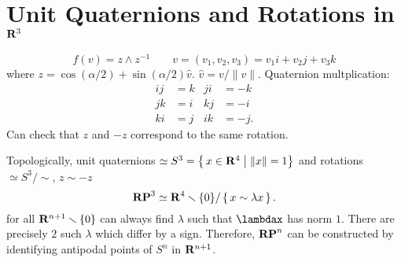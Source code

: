 \section[Unit Quaternions and Rotations in R3]{Unit Quaternions and Rotations in $\mathbf{R}^3$}
\[
f(v)=z\wedge z^{-1}\qquad
v=(v_1,v_2,v_3)=v_1i+v_2j+v_3k
\]
where $z=\cos(\alpha/2)+\sin(\alpha/2)\hat v$. $\hat v=v/\|v\|$. Quaternion
multplication:
\begin{align*}
ij&=k&ji&=-k\\
jk&=i&kj&=-i\\
ki&=j&ik&=-j.
\end{align*}
Can check that $z$ and $-z$ correspond to the same rotation.

Topologically, unit quaternions $\simeq
S^3=\left\{\,x\in\mathbf{R}^4\;\middle|\;\|x\|=1\right\}$ and rotations $\simeq
S^3/{\sim}$, $z\sim -z$
\[
\bfRP^3\simeq\bfR^4\minus\{0\}/\left\{\,x\sim\lambda x\,\right\}.
\]
for all $\bfR^{n+1}\minus\{0\}$ can always find $\lambda$ such that
$\lambdax$ has norm $1$. There are precisely $2$ such $\lambda$ which
differ by a sign. Therefore, $\mathbf{RP}^n$ can be constructed by identifying
antipodal points of $S^n$ in $\mathbf{R}^{n+1}$.

